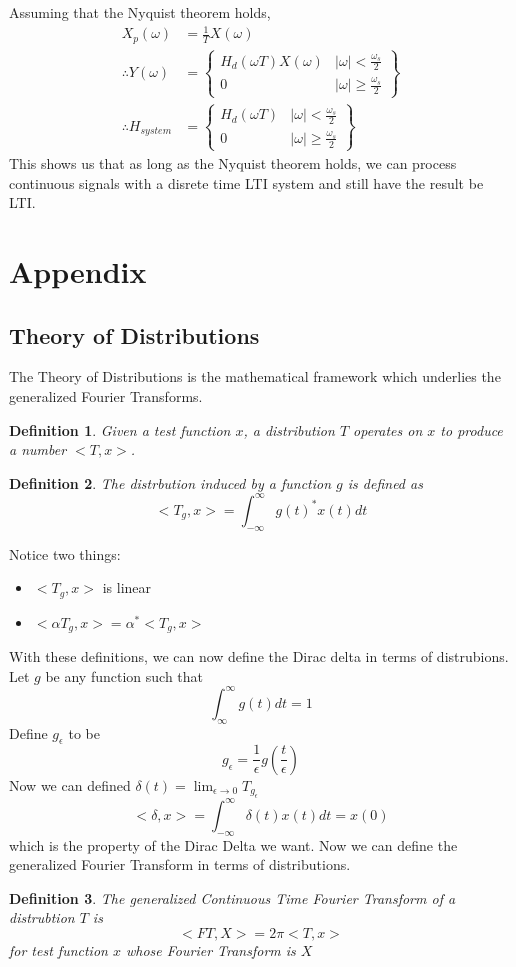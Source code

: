 \documentclass{article}
\newtheorem{definition}{Definition}
\begin{document}
Assuming that the Nyquist theorem holds,
\begin{align*}
    X_p(\omega) &= \frac{1}{T}X(\omega)\\
    \therefore Y(\omega) &= \left\{
        \begin{array}{cc}
            H_d(\omega T)X(\omega) & |\omega| < \frac{\omega_s}{2}\\
            0 & |\omega| \ge \frac{\omega_s}{2}
        \end{array}
    \right\}\\
        \therefore H_{system} &= \left\{\begin{array}{cc}
            H_d(\omega T) & |\omega| < \frac{\omega_s}{2}\\
            0 & |\omega| \ge \frac{\omega_s}{2}
        \end{array}
        \right\}
\end{align*}
This shows us that as long as the Nyquist theorem holds, we can process continuous signals
with a disrete time LTI system and still have the result be LTI.
\section{Appendix}
\subsection{Theory of Distributions}
The Theory of Distributions is the mathematical framework which underlies the generalized Fourier Transforms.
\begin{definition}
    Given a test function $x$, a distribution $T$ operates on $x$ to produce a number $<T,x>$.
\end{definition}
\begin{definition}
    The distrbution induced by a function $g$ is defined as
    $$<T_g, x> = \int_{-\infty}^{\infty}{g(t)^*x(t)dt}$$
\end{definition}
Notice two things:
\begin{itemize}
    \item $<T_g, x>$ is linear
    \item $<\alpha T_g, x> = \alpha^*<T_g, x>$
\end{itemize}
With these definitions, we can now define the Dirac delta in terms of distrubions.
Let $g$ be any function such that
$$\int_{\infty}^{\infty}{g(t)dt} = 1$$
Define $g_\epsilon$ to be
$$g_\epsilon = \frac{1}{\epsilon}g(\frac{t}{\epsilon})$$
Now we can defined $\delta(t) = \lim_{\epsilon \rightarrow 0}{T_{g_\epsilon}}$
$$<\delta, x> = \int_{-\infty}^{\infty}{\delta(t)x(t)dt} = x(0)$$ 
which is the property of the Dirac Delta we want. Now we can define the generalized Fourier Transform
in terms of distributions.
\begin{definition}
    The generalized Continuous Time Fourier Transform of a distrubtion $T$ is
    $$<FT, X> = 2\pi<T, x>$$
    for test function $x$ whose Fourier Transform is $X$
\end{definition}
\end{document}

